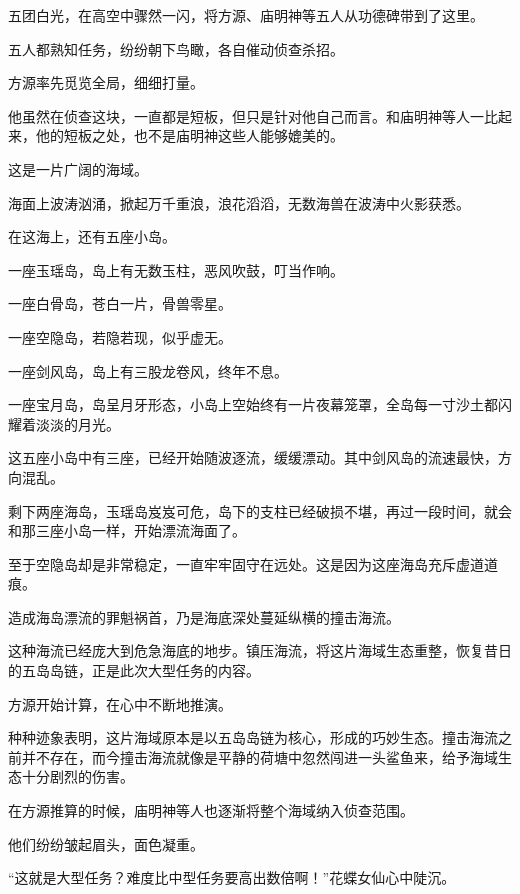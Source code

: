 
\begin{this_body}



五团白光，在高空中骤然一闪，将方源、庙明神等五人从功德碑带到了这里。

五人都熟知任务，纷纷朝下鸟瞰，各自催动侦查杀招。

方源率先觅览全局，细细打量。

他虽然在侦查这块，一直都是短板，但只是针对他自己而言。和庙明神等人一比起来，他的短板之处，也不是庙明神这些人能够媲美的。

这是一片广阔的海域。

海面上波涛汹涌，掀起万千重浪，浪花滔滔，无数海兽在波涛中火影获悉。

在这海上，还有五座小岛。

一座玉瑶岛，岛上有无数玉柱，恶风吹鼓，叮当作响。

一座白骨岛，苍白一片，骨兽零星。

一座空隐岛，若隐若现，似乎虚无。

一座剑风岛，岛上有三股龙卷风，终年不息。

一座宝月岛，岛呈月牙形态，小岛上空始终有一片夜幕笼罩，全岛每一寸沙土都闪耀着淡淡的月光。

这五座小岛中有三座，已经开始随波逐流，缓缓漂动。其中剑风岛的流速最快，方向混乱。

剩下两座海岛，玉瑶岛岌岌可危，岛下的支柱已经破损不堪，再过一段时间，就会和那三座小岛一样，开始漂流海面了。

至于空隐岛却是非常稳定，一直牢牢固守在远处。这是因为这座海岛充斥虚道道痕。

造成海岛漂流的罪魁祸首，乃是海底深处蔓延纵横的撞击海流。

这种海流已经庞大到危急海底的地步。镇压海流，将这片海域生态重整，恢复昔日的五岛岛链，正是此次大型任务的内容。

方源开始计算，在心中不断地推演。

种种迹象表明，这片海域原本是以五岛岛链为核心，形成的巧妙生态。撞击海流之前并不存在，而今撞击海流就像是平静的荷塘中忽然闯进一头鲨鱼来，给予海域生态十分剧烈的伤害。

在方源推算的时候，庙明神等人也逐渐将整个海域纳入侦查范围。

他们纷纷皱起眉头，面色凝重。

“这就是大型任务？难度比中型任务要高出数倍啊！”花蝶女仙心中陡沉。


\end{this_body}

